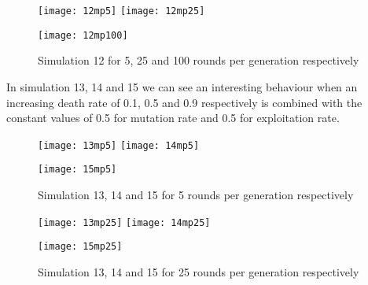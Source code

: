 \documentclass{book}
\begin{document}
\begin{figure}[H]       
    \begin{center}
    \mbox{\texttt{[image: 12mp5]}}   
    \hspace{0px}
    \mbox{\texttt{[image: 12mp25]}}
    \hspace{40px}
    \end{center}
    \begin{center}
    \mbox{\texttt{[image: 12mp100]}}
    \end{center}
    \caption{Simulation 12 for 5, 25 and 100 rounds per generation respectively}
    \label{simulation12mp}
\end{figure}

In simulation 13, 14 and 15 we can see an interesting behaviour when an increasing death rate of 0.1, 0.5 and 0.9 respectively is combined with the constant values of 0.5 for mutation rate and 0.5 for exploitation rate.


\begin{figure}[H]       
    \begin{center}
    \mbox{\texttt{[image: 13mp5]}}   
    \hspace{0px}
    \mbox{\texttt{[image: 14mp5]}}
    \hspace{40px}
    \end{center}
    \begin{center}
    \mbox{\texttt{[image: 15mp5]}}
    \end{center}
    \caption{Simulation 13, 14 and 15 for 5 rounds per generation respectively}
    \label{simulation131415mp5}
\end{figure}

\begin{figure}[H]       
    \begin{center}
    \mbox{\texttt{[image: 13mp25]}}   
    \hspace{0px}
    \mbox{\texttt{[image: 14mp25]}}
    \hspace{40px}
    \end{center}
    \begin{center}
    \mbox{\texttt{[image: 15mp25]}}
    \end{center}
    \caption{Simulation 13, 14 and 15 for 25 rounds per generation respectively}
    \label{simulation131415mp25}
\end{figure}
\end{document}

